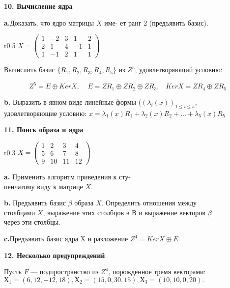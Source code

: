 \documentclass{../template/mai_book}
\begin{document}
\medskip

{\noindent\bf 10. Вычисление ядра}



{\bf a.}Доказать, что ядро матрицы $X$ име-
ет ранг 2 (предъявить базис).
\begin{wrapfigure}{r}{0.5\textwidth}
$X=\begin{pmatrix}
1 & -2 & 3 & 1 & 2\\
2 & 1 & 4 & -1 & 1\\
1 & -1 & 2 & 1 & 1
\end{pmatrix}$  
\end{wrapfigure}

Вычислить базис $\{R_1, R_2, R_3, R_4, R_5\}$ из $\mathit{Z}^5$, удовлетворяющий условию:

$$ \mathit{Z}^5=E\oplus KerX,\;\;\;\;E =\mathit{Z}R_1\oplus\mathit{Z}R_2\oplus\mathit{Z}R_3,\;\;\; Ker X= \mathit{Z}R_4\oplus\mathit{Z}R_5 $$
 
{\bf b.} Выразить в явном виде линейные формы ($(\lambda_i(x))_{1\leqslant i\leqslant 5},$ 
удовлетворяющие условию: $ x = \lambda_1(x)R_1+\lambda_2(x)R_2+...+\lambda_5(x)R_5 $


\pagebreak

{\noindent\bf11. Поиск образа и ядра}
\begin{wrapfigure}{r}{0.3\textwidth}
$X=\begin{pmatrix}
1 & 2 & 3 & 4 \\
5 & 6 & 7 & 8\\
9 & 10 & 11 & 12
\end{pmatrix}$  
\end{wrapfigure}

{\bf a.} Применить алгоритм приведения к сту-\\пенчатому виду к матрице $X$.
 
\bigskip

{\bf b.} Предъявить базис $ \beta $ образа $X$. Определить отношения между\\
столбцами $X$, выражение этих столбцов в В и выражение векторов $ \beta $\\ 
через эти столбцы. 

\medskip

{\bf c.}Предъявить базис ядра X и разложение $Z^4=Ker X \oplus E$. 

\medskip

{\noindent\bf 12. Несколько предупреждений}

\medskip

Пусть $F$ — подпространство из $Z^4$, порожденное тремя векторами:\\ 
$Х_1 = (6,12, -12,18), Х_2 = (15,0,30,15), Х_3 = (10,10,0,20).$
\end{document}
